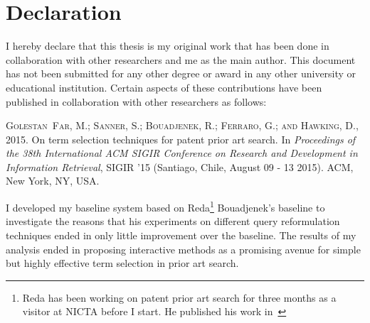 \chapter*{Declaration}
\vspace{-1em}
I hereby declare that this thesis is my original work that has been done in 
collaboration with other researchers and me as the main author. This document has
not been submitted for any other degree or award in any other university or educational 
institution. 
Certain aspects of these contributions have been published in 
collaboration with other researchers as follows:
\begin{itemize}
\textsc{Golestan~Far, M.; Sanner, S.; Bouadjenek, R.; Ferraro, G.; and Hawking,
  D.}, 2015.
\newblock On term selection techniques for patent prior art search.
\newblock In \emph{Proceedings of the 38th International ACM SIGIR Conference
  on Research and Development in Information Retrieval}, SIGIR '15 (Santiago,
  Chile, August 09 - 13 2015). ACM, New York, NY, USA.
  
\end{itemize}
I developed my baseline system based on Reda\footnote{Reda has been working on patent prior art search for three months as a visitor at NICTA before I start. He published his work in~\citep{Bouadjenek:2015:SQR:2746090.2746092}} Bouadjenek's baseline 
to investigate the reasons that his experiments on different query reformulation 
techniques ended in only little improvement over the baseline. The results of my analysis ended in proposing interactive methods as a promising avenue for simple but highly effective term selection in prior art search.
